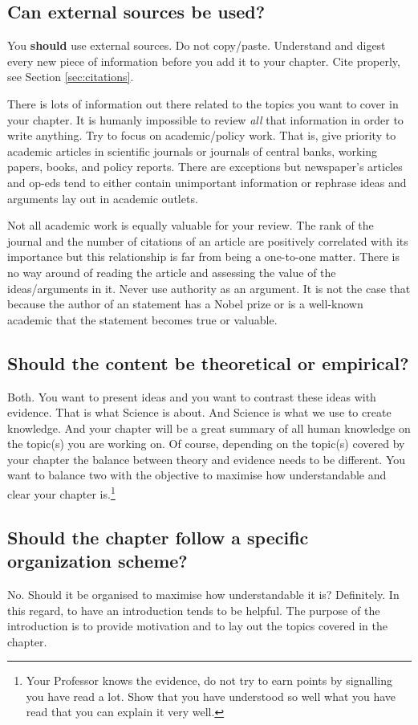 \documentclass[11pt,a4paper,oneside]{book}
\begin{document}
\subsection*{Can external sources be used?}
You \textbf{should} use external sources. Do not copy/paste. Understand and digest every new piece of information before you add it to your chapter. Cite properly, see Section \ref{sec:citations}.

There is lots of information out there related to the topics you want to cover in your chapter. It is humanly impossible to review \textit{all} that information in order to write anything. Try to focus on academic/policy work. That is, give priority to academic articles in scientific journals or journals of central banks, working papers, books, and policy reports. There are exceptions but newspaper's articles and op-eds tend to either contain unimportant information or rephrase ideas and arguments lay out in academic outlets.

Not all academic work is equally valuable for your review. The rank of the journal and the number of citations of an article are positively correlated with its importance but this relationship is far from being a one-to-one matter. There is no way around of reading the article and assessing the value of the ideas/arguments in it. Never use authority as an argument. It is not the case that because the author of an statement has a Nobel prize or is a well-known academic that the statement becomes true or valuable.

\subsection*{Should the content be theoretical or empirical?}
Both. You want to present ideas and you want to contrast these ideas with evidence. That is what Science is about. And Science is what we use to create knowledge. And your chapter will be a great summary of all human knowledge on the topic(s) you are working on. Of course, depending on the topic(s) covered by your chapter the balance between theory and evidence needs to be different. You want to balance two with the objective to maximise how understandable and clear your chapter is.\footnote{Your Professor knows the evidence, do not try to earn points by signalling you have read a lot. Show that you have understood so well what you have read that you can explain it very well.}

\subsection*{Should the chapter follow a specific organization scheme?}
No. Should it be organised to maximise how understandable it is? Definitely. In this regard, to have an introduction tends to be helpful. The purpose of the introduction is to provide motivation and to lay out the topics covered in the chapter.
\end{document}
